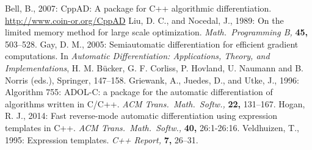 \documentclass[a4,oneside]{book}
\begin{document}
\begin{thebibliography}{00}
Bell, B., 2007: CppAD: A package for C++
algorithmic differentiation. \url{http://www.coin-or.org/CppAD}
% 
Liu, D. C., and Nocedal,
  J., 1989: On the limited memory method for large scale
optimization. \emph{Math.\ Programming B,} {\bf 45,} 503--528.
%
Gay, D. M., 2005: Semiautomatic
differentiation for efficient gradient computations.  In
\emph{Automatic Differentiation: Applications, Theory, and
  Implementations}, H. M. B\"ucker, G. F. Corliss, P.  Hovland,
U. Naumann and B. Norris (eds.), Springer, 147--158.
%
Griewank, A.,
  Juedes, D., and Utke, J., 1996:  Algorithm 755: ADOL-C: a package for the
automatic differentiation of algorithms written in C/C++. \textit{ACM
  Trans.\ Math.\ Softw.,} \textbf{22,} 131--167.
Hogan, R. J., 2014: Fast reverse-mode
  automatic differentiation using expression templates in
  C++. \textit{ACM Trans.\ Math.\ Softw.,} \textbf{40,} 26:1-26:16.
Veldhuizen, T., 1995:
Expression templates. {\it C++ Report,} {\bf 7,} 26--31.
\end{thebibliography}
\end{document}
